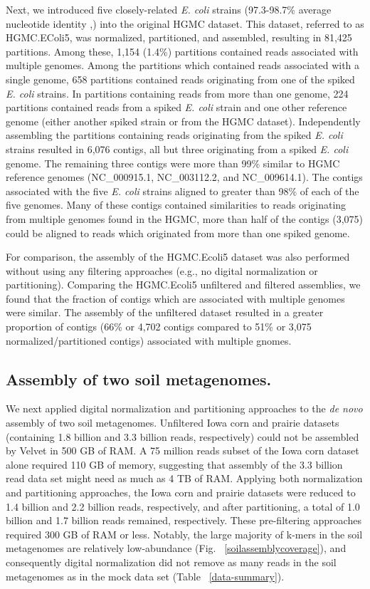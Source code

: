 \documentclass{pnastwo}
\begin{document}
\begin{article}
Next, we introduced five closely-related \emph{E. coli} strains (97.3-98.7\% average nucleotide identity 
,\cite{ani}) into the original HGMC dataset. This dataset, referred to as HGMC.EColi5, was normalized,
partitioned, and assembled, resulting in 81,425 partitions. Among these, 1,154
(1.4\%) partitions contained reads associated with multiple genomes. Among the
partitions which contained reads associated with a single genome, 658 partitions
contained reads originating from one of the spiked \emph{E. coli} strains. In
partitions containing reads from more than one genome, 224 partitions contained
reads from a spiked \emph{E. coli} strain and one other reference genome (either
another spiked strain or from the HGMC dataset). Independently assembling the
partitions containing reads originating from the spiked \emph{E. coli} strains
resulted in 6,076 contigs, all but three originating from a spiked \emph{E.
coli} genome. The remaining three contigs were more than 99\% similar to HGMC
reference genomes (NC\_000915.1, NC\_003112.2, and NC\_009614.1). The contigs
associated with the five \emph{E. coli} strains aligned to greater than 98\% of
each of the five genomes. Many of these contigs contained similarities to reads
originating from multiple genomes found in the HGMC, more than half of the contigs (3,075) 
could be aligned to reads which originated from more than one spiked genome.

For comparison, the assembly of the HGMC.Ecoli5 dataset was also performed
without using any filtering approaches (e.g., no digital normalization or
partitioning). Comparing the HGMC.Ecoli5 unfiltered and filtered assemblies, we
found that the fraction of contigs which are associated with multiple genomes
were similar.  The assembly of the unfiltered dataset resulted in a greater proportion of contigs (66\% or 4,702 contigs compared to 51\% or 3,075 normalized/partitioned contigs) associated with multiple gnomes.

\subsection*{Assembly of two soil metagenomes.} We next applied digital
normalization and partitioning approaches to the {\em de novo} assembly of two
soil metagenomes. Unfiltered Iowa corn and prairie datasets (containing 1.8
billion and 3.3 billion reads, respectively) could not be assembled by Velvet in
500 GB of RAM. A 75 million reads subset of the Iowa corn dataset alone required
110 GB of memory, suggesting that assembly of the 3.3 billion read data set
might need as much as 4 TB of RAM. Applying both normalization and partitioning approaches, 
the Iowa corn and prairie datasets were reduced to
1.4 billion and 2.2 billion reads, respectively, and after partitioning, a total
of 1.0 billion and 1.7 billion reads remained, respectively. These pre-filtering
approaches required 300 GB of RAM or less. Notably, the large majority of k-mers
in the soil metagenomes are relatively low-abundance (Fig.
~\ref{soilassemblycoverage}), and consequently digital normalization did not
remove as many reads in the soil metagenomes as in the mock data set (Table
~\ref{data-summary}).


\end{article}
\end{document}
